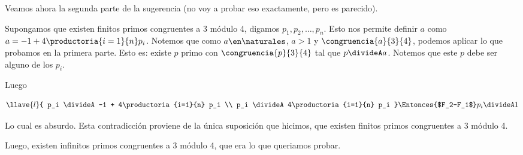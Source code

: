 Veamos ahora la segunda parte de la sugerencia (no voy a probar eso exactamente, pero es parecido). \par
Supongamos que existen finitos primos congruentes a 3 módulo 4, digamos $p_1, p_2, \dots, p_n$.
Esto nos permite definir $a$ como $a = -1 + 4\productoria{i=1}{n} p_i$.
Notemos que como $a \en \naturales$, $a > 1$ y $\congruencia{a}{3}{4}$, podemos aplicar lo que probamos en la primera parte.
Esto es: existe $p$ primo con $\congruencia{p}{3}{4}$ tal que $p \divideA a$. Notemos que este $p$ debe ser alguno de los $p_i$. \par
Luego

$$
  \llave{l}{
    p_i \divideA -1 + 4\productoria{i=1}{n} p_i \\
    p_i \divideA 4\productoria{i=1}{n} p_i
  }
  \Entonces{$F_2-F_1$}
  p_i \divideA 1
$$

Lo cual es absurdo. Esta contradicción proviene de la única suposición que hicimos, que existen finitos primos congruentes a 3 módulo 4. \par
Luego, existen infinitos primos congruentes a 3 módulo 4, que era lo que queriamos probar.

\begin{aportes}
  \item {}
\end{aportes}

